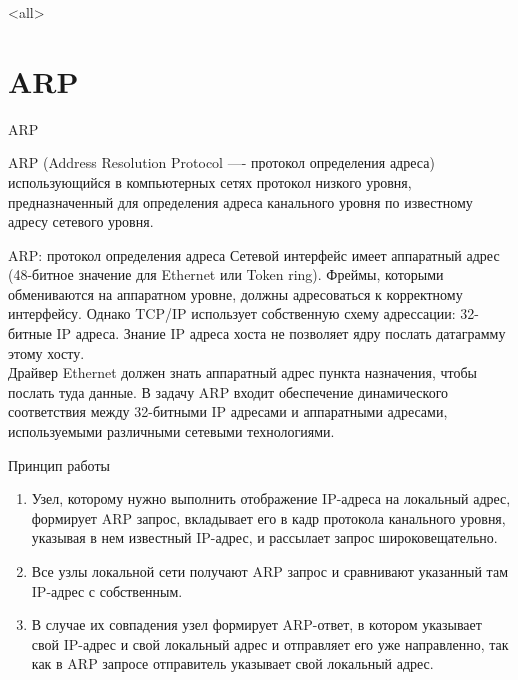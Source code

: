 

\subtitle[TCP/IP]{Стек протоколов TCP/IP\\(Продолжение)}



\mode<all>{}

%
%

\section{ARP}

\begin{frame}{ARP}
	\begin{block}{ARP (Address Resolution Protocol —- протокол определения адреса)}
		использующийся в компьютерных сетях протокол низкого уровня,  предназначенный для определения адреса канального уровня по известному адресу сетевого уровня.
	\end{block}
\end{frame}


\begin{frame}{ARP: протокол определения адреса}
	Сетевой интерфейс имеет аппаратный адрес (48-битное значение для Ethernet или Token ring). 
Фреймы,  которыми обмениваются на аппаратном уровне,  должны адресоваться к корректному интерфейсу. 
Однако TCP/IP использует собственную схему адрессации: 32-битные IP адреса. 
Знание IP адреса хоста не позволяет ядру послать датаграмму этому хосту.\\
Драйвер Ethernet должен знать аппаратный адрес пункта назначения,  чтобы послать туда данные. В задачу ARP входит обеспечение динамического соответствия между 32-битными IP адресами и аппаратными адресами,  используемыми различными сетевыми технологиями.
\end{frame}

\begin{frame}{Принцип работы}
	\begin{enumerate}
		\item Узел,  которому нужно выполнить отображение IP-адреса на локальный адрес,  формирует ARP запрос,  вкладывает его в кадр протокола канального уровня,  указывая в нем известный IP-адрес,  и рассылает запрос широковещательно.
		\item Все узлы локальной сети получают ARP запрос и сравнивают указанный там IP-адрес с собственным.
		\item В случае их совпадения узел формирует ARP-ответ,  в котором указывает свой IP-адрес и свой локальный адрес и отправляет его уже направленно,  так как в ARP запросе отправитель указывает свой локальный адрес.
	\end{enumerate}
\end{frame}

